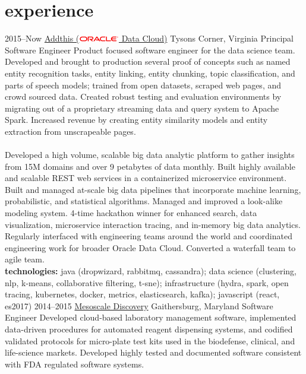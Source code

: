 \documentclass[]{friggeri-cv} %
\begin{document}
\section{experience}
\begin{entrylist}
\entry
{2015--Now}
{\href{https://www.addthis.com/}{Addthis (\includegraphics[width=50pt]{500px-Oracle_logo.svg.png}  Data Cloud)}}
{Tysons Corner, Virginia}
{Principal Software Engineer}
{
	Product focused software engineer for the data science team. Developed and brought to production several proof of concepts such as named entity recognition tasks, entity linking, entity chunking, topic classification, and parts of speech models; trained from open datasets, scraped web pages, and crowd sourced data. Created robust testing and evaluation environments by migrating out of a proprietary streaming data and query system to Apache Spark. Increased revenue by creating entity similarity models and entity extraction from unscrapeable pages.\\\\
	Developed a high volume, scalable big data analytic platform to gather insights from 15M domains and over 9 petabytes of data monthly. Built highly available and scalable REST web services in a containerized microservice environment. Built and managed at-scale big data pipelines that incorporate machine learning, probabilistic, and statistical algorithms. Managed and improved a look-alike modeling system. 4-time hackathon winner for enhanced search, data visualization, microservice interaction tracing, and in-memory big data analytics. Regularly interfaced with engineering teams around the world and coordinated engineering work for broader Oracle Data Cloud. Converted a waterfall team to agile team.\\
	\textbf{technologies:} java (dropwizard, rabbitmq, cassandra); data science (clustering, nlp, k-means, collaborative filtering, t-sne); infrastructure (hydra, spark, open tracing, kubernetes, docker, metrics, elasticsearch, kafka); javascript (react, es2017)
}
\entry
{2014--2015}
{\href{https://www.mesoscale.com/}{Mesoscale Discovery}}
{Gaithersburg, Maryland}
{Software Engineer}
{
	Developed cloud-based laboratory management software, implemented data-driven procedures for automated reagent dispensing systems, and codified validated protocols for micro-plate test kits used in the biodefense, clinical, and life-science markets. Developed highly tested and documented software consistent with FDA regulated software systems.\\
}
\end{entrylist}
\end{document}

